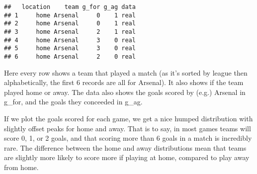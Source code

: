 \documentclass[]{article}
\newenvironment{Shaded}{\begin{snugshade}}{\end{snugshade}}
\newcommand{\KeywordTok}[1]{\textcolor[rgb]{0.13,0.29,0.53}{\textbf{#1}}}
\newcommand{\DataTypeTok}[1]{\textcolor[rgb]{0.13,0.29,0.53}{#1}}
\newcommand{\DecValTok}[1]{\textcolor[rgb]{0.00,0.00,0.81}{#1}}
\newcommand{\StringTok}[1]{\textcolor[rgb]{0.31,0.60,0.02}{#1}}
\newcommand{\CommentTok}[1]{\textcolor[rgb]{0.56,0.35,0.01}{\textit{#1}}}
\newcommand{\OperatorTok}[1]{\textcolor[rgb]{0.81,0.36,0.00}{\textbf{#1}}}
\newcommand{\NormalTok}[1]{#1}
\begin{document}
\begin{Shaded}
\end{Shaded}

\begin{verbatim}
##   location    team g_for g_ag data
## 1     home Arsenal     0    1 real
## 2     home Arsenal     0    1 real
## 3     home Arsenal     2    1 real
## 4     home Arsenal     3    0 real
## 5     home Arsenal     3    0 real
## 6     home Arsenal     2    0 real
\end{verbatim}

Here every row shows a team that played a match (as it's sorted by
league then alphabetically, the first 6 records are all for Arsenal). It
also shows if the team played home or away. The data also shows the
goals scored by (e.g.) Arsenal in g\_for, and the goals they conceeded
in g\_ag.

If we plot the goals scored for each game, we get a nice humped
distribution with slightly offset peaks for home and away. That is to
say, in most games teams will score 0, 1, or 2 goals, and that scoring
more than 6 goals in a match is incredibly rare. The difference between
the home and away distributions mean that teams are slightly more likely
to score more if playing at home, compared to play away from home.
\end{document}
